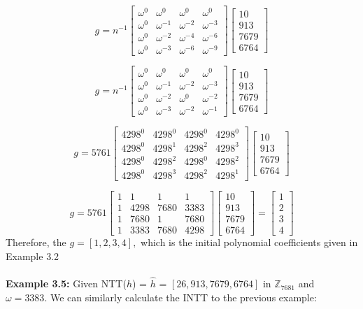 \documentclass[12pt]{report}
\begin{document}
\[g=n^{-1}\begin{bmatrix}\omega^{0}&\omega^{0}&\omega^{0}&\omega^{0}\\ \omega^{0}&\omega^{-1}&\omega^{-2}&\omega^{-3}\\ \omega^{0}&\omega^{-2}&\omega^{-4}&\omega^{-6}\\ \omega^{0}&\omega^{-3}&\omega^{-6}&\omega^{-9}\end{bmatrix}\begin{bmatrix}10\\ 913\\ 7679\\ 6764\end{bmatrix}\]

\[g=n^{-1}\begin{bmatrix}\omega^{0}&\omega^{0}&\omega^{0}&\omega^{0}\\ \omega^{0}&\omega^{-1}&\omega^{-2}&\omega^{-3}\\ \omega^{0}&\omega^{-2}&\omega^{0}&\omega^{-2}\\ \omega^{0}&\omega^{-3}&\omega^{-2}&\omega^{-1}\end{bmatrix}\begin{bmatrix}10\\ 913\\ 7679\\ 6764\end{bmatrix}\]

\[g=5761\begin{bmatrix}4298^{0}&4298^{0}&4298^{0}&4298^{0}\\ 4298^{0}&4298^{1}&4298^{2}&4298^{3}\\ 4298^{0}&4298^{2}&4298^{0}&4298^{2}\\ 4298^{0}&4298^{3}&4298^{2}&4298^{1}\end{bmatrix}\begin{bmatrix}10\\ 913\\ 7679\\ 6764\end{bmatrix}\]

\[g=5761\begin{bmatrix}1&1&1&1\\ 1&4298&7680&3383\\ 1&7680&1&7680\\ 1&3383&7680&4298\end{bmatrix}\begin{bmatrix}10\\ 913\\ 7679\\ 6764\end{bmatrix}=\begin{bmatrix}1\\ 2\\ 3\\ 4\end{bmatrix}\]
Therefore, the $g=[1,2,3,4],$ which is the initial polynomial coefficients given in Example 3.2 \\ \\
\textbf{Example 3.5:} 
Given NTT($h$) = $\hat{h}$ = $[26,913,7679,6764]$ in $\mathbb{Z}_{7681}$ and $\omega=3383.$ We can similarly calculate the INTT to the previous example:
\end{document}
